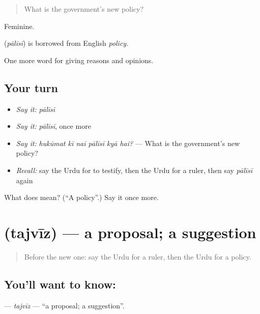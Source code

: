 \begin{quote}
What is the government's new policy?
\end{quote}

Feminine.

\begin{cousinweb}
\textbf{} (\emph{pālīsī}) is borrowed from English \emph{policy}.
\end{cousinweb}

\begin{grammarlens}[title={What you've built}]
One more word for giving reasons and opinions.
\end{grammarlens}

\subsection*{Your turn}
\begin{itemize}
\raggedright
  \item \emph{Say it:} \emph{pālīsī}
  \item \emph{Say it:} \emph{pālīsī}, once more
  \item \emph{Say it:} \emph{hukūmat kī naī pālīsī kyā hai?} — What is the government's new policy?
  \item \emph{Recall:} say the Urdu for to testify, then the Urdu for a ruler, then say \emph{pālīsī} again
\end{itemize}

\begin{tcolorbox}[breakable,colback=teal!4,colframe=teal!35!black,title={Before you move on}]
What does  mean? (\textquotedblleft{}A policy\textquotedblright{}.) Say it once more.
\end{tcolorbox}
\section[\texorpdfstring{\ur{تجویز} (tajvīz)}{تجویز (tajvīz)}]{ (tajvīz) — a proposal; a suggestion}

\label{lesson:UR-C341-tajviz}



\begin{quote}
Before the new one: say the Urdu for a ruler, then the Urdu for a policy.
\end{quote}

\subsection*{You'll want to know: }
\textbf{} — \emph{tajvīz} — \textquotedblleft{}a proposal; a suggestion\textquotedblright{}.

